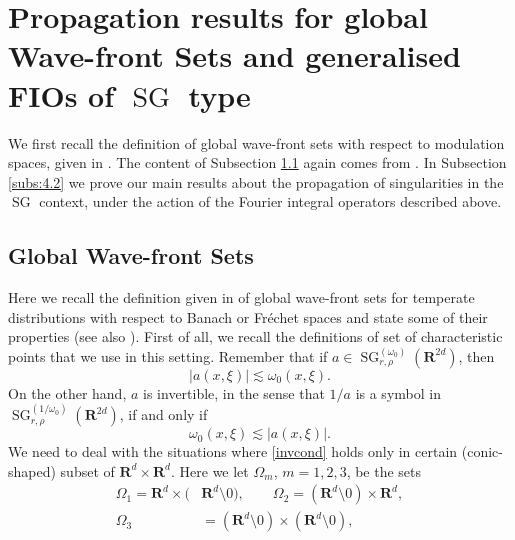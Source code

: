 \documentclass[12pt,a4paper,reqno]{amsart}
\numberwithin{equation}{section}
\numberwithin{thm}{section}
\theoremstyle{definition}
\theoremstyle{remark}
\begin{document}
\par

\section{Propagation results for global Wave-front Sets and
generalised FIOs of ${\operatorname{SG}}$ type}\label{sec4}

\par

We first recall the definition of global wave-front sets with respect
to modulation spaces, given in \cite{CJT2}. The content of
Subsection \ref{subs:4.1} again comes from \cite{CJT3}.
In Subsection \ref{subs:4.2} we prove our main results about the propagation
of singularities in the ${\operatorname{SG}}$ context, under the action of the Fourier integral
operators described above. 

\par

\subsection{Global Wave-front Sets}\label{subs:4.1}
Here we recall the definition given in \cite{CJT2} of global
wave-front sets for temperate distributions with respect to Banach
or Fr\'echet spaces and state some of their properties (see also
\cite{CJT3}). First of all, we recall the definitions of set of
characteristic points that we use in this setting.
Remember that if $a\in {\operatorname{SG}}^{(\omega _0 )}_{r,\rho}({\mathbf R^{{2d}}})$, then
$$
|a(x,\xi )|\lesssim \omega _0 (x,\xi ).
$$
On the other hand, $a$ is invertible, in the sense that $1/a$ is a symbol in
${\operatorname{SG}}^{(1/\omega _0 )}_{r,\rho}({\mathbf R^{{2d}}})$, if and only if
\begin{equation}\label{invcond}
\omega _0 (x,\xi )\lesssim |a(x,\xi )|.
\end{equation}
We need to deal with the situations where \eqref{invcond} holds only in certain
(conic-shaped) subset of ${\mathbf R^{d}} \times {\mathbf R^{d}}$. Here we let $\Omega _m$,
$m=1,2,3$, be the sets
\begin{equation}\label{omegasets}
\begin{aligned}
\Omega _1= {\mathbf R^{d}}\times (&{\mathbf R^{d}}\setminus 0),\qquad
\Omega _2 = ({\mathbf R^{d}} \setminus 0)\times {\mathbf R^{d}},
\\[1ex]
\Omega _3 &= ({\mathbf R^{d}} \setminus 0)\times ({\mathbf R^{d}} \setminus 0),
\end{aligned}
\end{equation}
\end{document}
